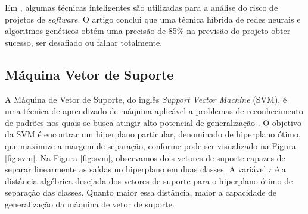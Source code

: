 Em \cite{HUHUANG2007}, algumas técnicas inteligentes são utilizadas para a análise do risco de projetos de \textit{software}. O artigo conclui que uma técnica híbrida de redes neurais e algoritmos genéticos obtém uma precisão de 85\% na previsão do projeto obter sucesso, ser desafiado ou falhar totalmente.

\subsection{Máquina Vetor de Suporte}

A Máquina de Vetor de Suporte, do inglês \textit{Support Vector Machine} (SVM), é uma técnica de aprendizado de máquina aplicável a problemas de reconhecimento de padrões nos quais se busca atingir alto potencial de generalização \cite{HAYKIN2007} \cite{valenca2005aplicando}. O objetivo da SVM é encontrar um hiperplano particular, denominado de hiperplano ótimo, que maximize a margem de separação, conforme pode ser visualizado na Figura \ref{fig:svm}. Na Figura \ref{fig:svm}, observamos dois vetores de suporte capazes de separar linearmente as saídas no hiperplano em duas classes. A variável $r$ é a distância algébrica desejada dos vetores de suporte para o hiperplano ótimo de separação das classes. Quanto maior essa distância, maior a capacidade de generalização da máquina de vetor de suporte.

